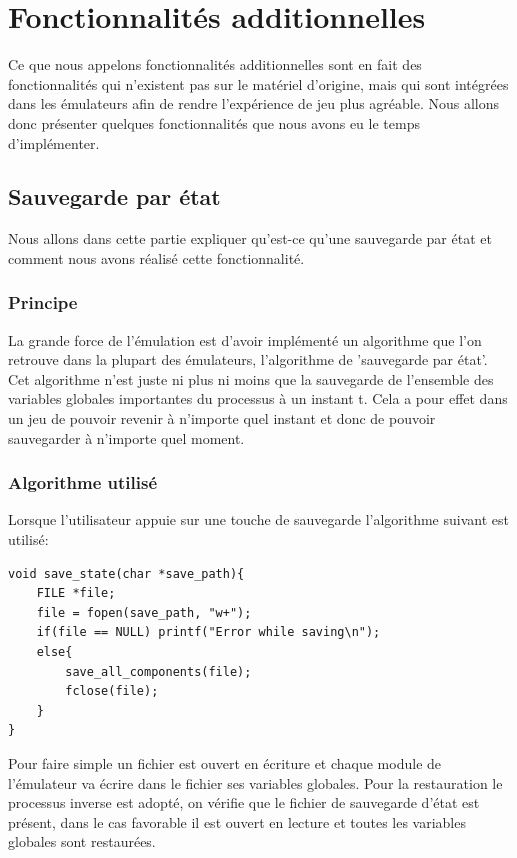 \documentclass{report}
\begin{document}
\section{Fonctionnalités additionnelles}
Ce que nous appelons fonctionnalités additionnelles sont en fait des fonctionnalités qui n'existent pas sur le matériel d'origine, mais qui sont intégrées dans les émulateurs afin de rendre l'expérience de jeu plus agréable. Nous allons donc présenter quelques fonctionnalités que nous avons eu le temps d'implémenter.
\subsection{Sauvegarde par état}
Nous allons dans cette partie expliquer qu'est-ce qu'une sauvegarde par état et comment nous avons réalisé cette fonctionnalité.
\subsubsection{Principe}
La grande force de l'émulation est d'avoir implémenté un algorithme que l'on retrouve dans la plupart des émulateurs, l'algorithme de 'sauvegarde par état'. Cet algorithme n'est juste ni plus ni moins que la sauvegarde de l'ensemble des variables globales importantes du processus à un instant t. Cela a pour effet dans un jeu de pouvoir revenir à n'importe quel instant et donc de pouvoir sauvegarder à n'importe quel moment.
\subsubsection{Algorithme utilisé}
Lorsque l'utilisateur appuie sur une touche de sauvegarde l'algorithme suivant est utilisé:
\begin{lstlisting}
void save_state(char *save_path){
	FILE *file;
	file = fopen(save_path, "w+");
	if(file == NULL) printf("Error while saving\n");
	else{
		save_all_components(file);
		fclose(file);
	}
}
\end{lstlisting}
Pour faire simple un fichier est ouvert en écriture et chaque module de l'émulateur va écrire dans le fichier ses variables globales.
Pour la restauration le processus inverse est adopté, on vérifie que le fichier de sauvegarde d'état est présent, dans le cas favorable il est ouvert en lecture et toutes les variables globales sont restaurées.
\end{document}
